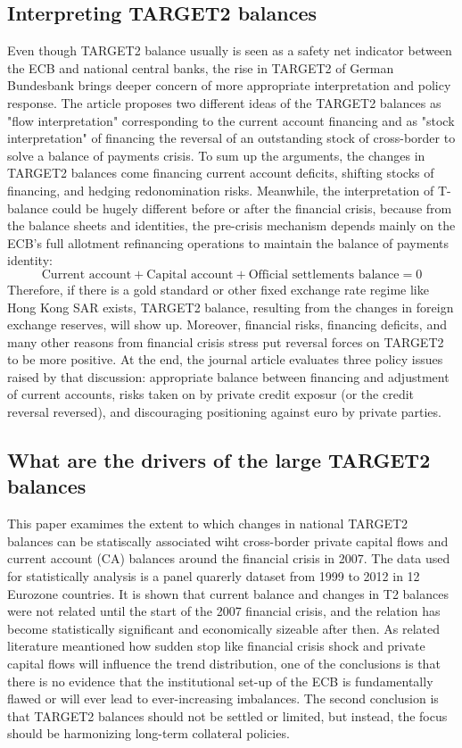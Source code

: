 \documentclass[12pt]{article}
\begin{document}
\subsection{Interpreting TARGET2 balances}
Even though TARGET2 balance usually is seen as a safety net indicator between the ECB and national central banks, the rise in TARGET2 of German Bundesbank brings deeper concern of more appropriate interpretation and policy response. The article proposes two different ideas of the TARGET2 balances as "flow interpretation" corresponding to the current account financing and as "stock interpretation" of financing the reversal of an outstanding stock of cross-border to solve a balance of payments crisis. To sum up the arguments, the changes in TARGET2 balances come financing current account deficits, shifting stocks of financing, and hedging redonomination risks. Meanwhile, the interpretation of T-balance could be hugely different before or after the financial crisis, because from the balance sheets and identities, the pre-crisis mechanism depends mainly on the ECB's full allotment refinancing operations to maintain the balance of payments identity: 
\begin{equation*}
\text{Current account} + \text{Capital account} + \text{Official settlements balance} = 0 
\end{equation*}
Therefore, if there is a gold standard or other fixed exchange rate regime like Hong Kong SAR exists, TARGET2 balance, resulting from the changes in foreign exchange reserves, will show up. Moreover, financial risks, financing deficits, and many other reasons from financial crisis stress put reversal forces on TARGET2 to be more positive. At the end, the journal article evaluates three policy issues raised by that discussion: appropriate balance between financing and adjustment of current accounts, risks taken on by private credit exposur (or the credit reversal reversed), and discouraging positioning against euro by private parties. 

\subsection{What are the drivers of the large TARGET2 balances}
This paper examimes the extent to which changes in national TARGET2 balances can be statiscally associated wiht cross-border private capital flows and current account (CA) balances around the financial crisis in 2007. The data used for statistically analysis is a panel quarerly dataset from 1999 to 2012 in 12 Eurozone countries. It is shown that current balance and changes in T2 balances were not related until the start of the 2007 financial crisis, and the relation has become statistically significant and economically sizeable after then. As related literature meantioned how sudden stop like financial crisis shock and private capital flows will influence the trend distribution, one of the conclusions is that there is no evidence that the institutional set-up of the ECB is fundamentally flawed or will ever lead to ever-increasing imbalances. The second conclusion is that TARGET2 balances should not be settled or limited, but instead, the focus should be harmonizing long-term collateral policies. 
\end{document}
